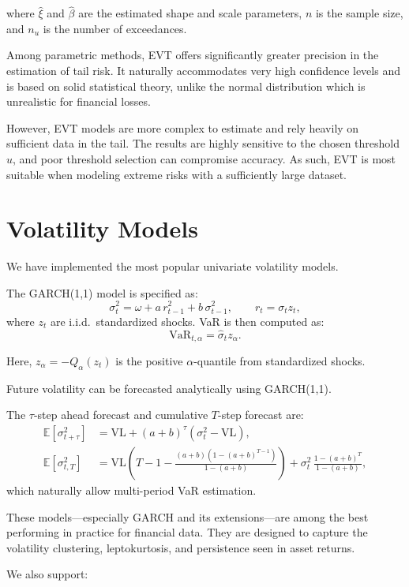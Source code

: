 \documentclass[12pt]{article}
\begin{document}
where $\hat{\xi}$ and $\hat{\beta}$ are the estimated shape and scale parameters, $n$ is the sample size, and $n_u$ is the number of exceedances.

Among parametric methods, EVT offers significantly greater precision in the estimation of tail risk. It naturally accommodates very high confidence levels and is based on solid statistical theory, unlike the normal distribution which is unrealistic for financial losses.

However, EVT models are more complex to estimate and rely heavily on sufficient data in the tail. The results are highly sensitive to the chosen threshold $u$, and poor threshold selection can compromise accuracy. As such, EVT is most suitable when modeling extreme risks with a sufficiently large dataset.


\section{Volatility Models}

We have implemented the most popular univariate volatility models.

The GARCH(1,1) model is specified as:
\[
  \sigma_t^2 = \omega + a\, r_{t-1}^2 + b\, \sigma_{t-1}^2, \qquad r_t = \sigma_t z_t,
\]
where \( z_t \) are i.i.d.\ standardized shocks. VaR is then computed as:
\[
  \text{VaR}_{t,\alpha} = \hat{\sigma}_t z_\alpha.
\]

Here, \( z_\alpha = -Q_\alpha(z_t) \) is the positive \( \alpha \)-quantile from standardized shocks.

Future volatility can be forecasted analytically using GARCH(1,1).

The \( \tau \)-step ahead forecast and cumulative \( T \)-step forecast are:
\begin{align*}
  \mathbb{E}[\sigma_{t+\tau}^2] &= \mathrm{VL} + (a + b)^\tau(\sigma_t^2 - \mathrm{VL}),  \\  
  \mathbb{E}[\sigma_{t,T}^2] &= \mathrm{VL}\left(T - 1 - \frac{(a + b)(1 - (a + b)^{T - 1})}{1 - (a + b)}\right)
    + \sigma_t^2\, \frac{1 - (a + b)^T}{1 - (a + b)},
\end{align*}
which naturally allow multi-period VaR estimation.

These models—especially GARCH and its extensions—are among the best performing in practice for financial data. They are designed to capture the volatility clustering, leptokurtosis, and persistence seen in asset returns.


We also support:
\end{document}

